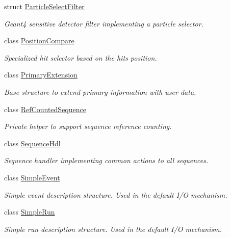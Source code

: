 \begin{DoxyCompactItemize}
struct \hyperlink{struct_d_d4hep_1_1_simulation_1_1_particle_select_filter}{Particle\+Select\+Filter}
\begin{DoxyCompactList}\small\item\em Geant4 sensitive detector filter implementing a particle selector. \end{DoxyCompactList}\item 
class \hyperlink{class_d_d4hep_1_1_simulation_1_1_position_compare}{Position\+Compare}
\begin{DoxyCompactList}\small\item\em Specialized hit selector based on the hit\textquotesingle{}s position. \end{DoxyCompactList}\item 
class \hyperlink{class_d_d4hep_1_1_simulation_1_1_primary_extension}{Primary\+Extension}
\begin{DoxyCompactList}\small\item\em Base structure to extend primary information with user data. \end{DoxyCompactList}\item 
class \hyperlink{class_d_d4hep_1_1_simulation_1_1_ref_counted_sequence}{Ref\+Counted\+Sequence}
\begin{DoxyCompactList}\small\item\em Private helper to support sequence reference counting. \end{DoxyCompactList}\item 
class \hyperlink{class_d_d4hep_1_1_simulation_1_1_sequence_hdl}{Sequence\+Hdl}
\begin{DoxyCompactList}\small\item\em Sequence handler implementing common actions to all sequences. \end{DoxyCompactList}\item 
class \hyperlink{class_d_d4hep_1_1_simulation_1_1_simple_event}{Simple\+Event}
\begin{DoxyCompactList}\small\item\em Simple event description structure. Used in the default I/O mechanism. \end{DoxyCompactList}\item 
class \hyperlink{class_d_d4hep_1_1_simulation_1_1_simple_run}{Simple\+Run}
\begin{DoxyCompactList}\small\item\em Simple run description structure. Used in the default I/O mechanism. \end{DoxyCompactList}\item 

\end{DoxyCompactItemize}
